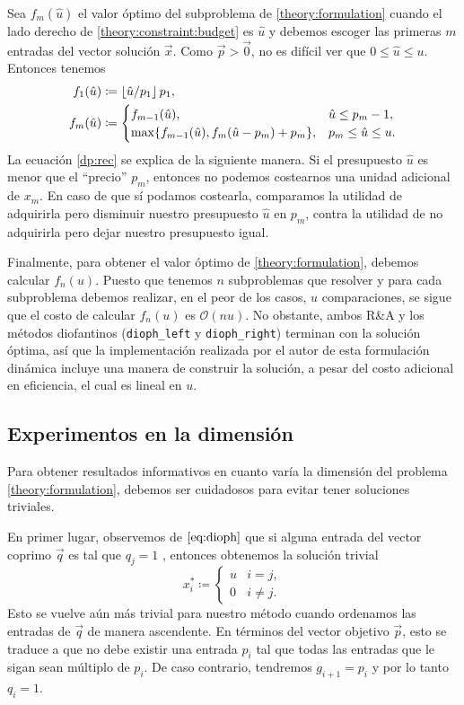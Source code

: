 Sea $f_m(\hat{u})$ el valor óptimo del subproblema de \eqref{theory:formulation} cuando el
lado derecho de \eqref{theory:constraint:budget} es $\hat{u}$ y debemos escoger las
primeras $m$ entradas del vector solución $\vec{x}$. Como $\vec{p} > \vec{0}$, no es difícil ver que $0 \leq
\hat{u} \leq u$. Entonces tenemos
\begin{subequations}
	\begin{align}
		\label{formulation:dp}
		f_1(\hat{u}) &\coloneq \left\lfloor \hat{u}/p_1 \right\rfloor p_1, \\
		f_m(\hat{u}) &\coloneq \begin{cases}
			f_{m-1}(\hat{u}), & \hat{u} \leq p_m - 1, \\
			\max\lbrace f_{m - 1}(\hat{u}), f_{m}(\hat{u} - p_m) + p_m \rbrace, & p_m \leq \hat{u} \leq u.
			\label{dp:rec}
		\end{cases}
	\end{align}
\end{subequations}
La ecuación \eqref{dp:rec} se explica de la siguiente manera. Si el presupuesto $\hat{u}$ es menor
que el ``precio'' $p_m$, entonces no podemos costearnos una unidad adicional de $x_m$. En caso de que sí
podamos costearla, comparamos la utilidad de adquirirla pero disminuir nuestro
presupuesto $\hat{u}$ en $p_m$, contra la utilidad de no adquirirla pero dejar nuestro presupuesto
igual.

Finalmente, para obtener el valor óptimo de \eqref{theory:formulation}, debemos calcular $f_n(u)$.
Puesto que tenemos $n$ subproblemas que resolver y para cada subproblema debemos realizar, en el
peor de los casos, $u$ comparaciones, se sigue que el costo de calcular $f_n(u)$ es $\mathcal{O}(nu)$.
No obstante, ambos R\&A y los métodos diofantinos (\texttt{dioph\_left} y
\texttt{dioph\_right}) terminan con la solución óptima, así que la implementación realizada por el
autor de esta formulación dinámica incluye una manera de construir la solución, a pesar del costo
adicional en eficiencia, el cual es lineal en $u$.

\subsection{Experimentos en la dimensión}
\label{subsec:exp:fin:n}
\noindent
Para obtener resultados informativos en cuanto varía la dimensión del problema
\eqref{theory:formulation}, debemos ser cuidadosos para evitar tener soluciones triviales.

En primer lugar, observemos de $\eqref{eq:dioph}$ que si alguna entrada del vector coprimo $\vec{q}$
es tal que $q_j = 1$ , entonces obtenemos la solución trivial
\begin{equation*}
	x_i^* \coloneq \begin{cases}
		u & i = j, \\
		0 & i \neq j.
	\end{cases}
\end{equation*}
Esto se vuelve aún más trivial para nuestro método cuando ordenamos las entradas de $\vec{q}$ de
manera ascendente. En términos del vector objetivo $\vec{p}$, esto se traduce a que no debe existir una
entrada $p_i$ tal que todas las entradas que le sigan sean múltiplo de $p_i$. De caso contrario,
tendremos $g_{i + 1} = p_i$ y por lo tanto $q_i = 1$.

